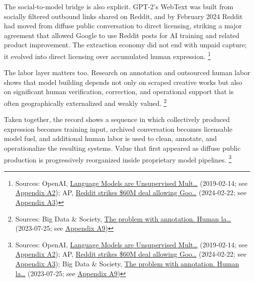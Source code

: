 \documentclass[
  american,
  11pt,
  letterpaper,
]{article}
\begin{document}
The social-to-model bridge is also explicit. GPT-2's WebText was built
from socially filtered outbound links shared on Reddit, and by February
2024 Reddit had moved from diffuse public conversation to direct
licensing, striking a major agreement that allowed Google to use Reddit
posts for AI training and related product improvement. The extraction
economy did not end with unpaid capture; it evolved into direct
licensing over accumulated human expression. \footnote{Sources: OpenAI,
  \href{https://cdn.openai.com/better-language-models/language_models_are_unsupervised_multitask_learners.pdf}{Language
  Models are Unsupervised Mult\ldots{}} (2019-02-14; see
  \hyperref[ch-04-appendix-a2-language-models-are-unsupervised-multitask-learners]{Appendix
  A2}); AP,
  \href{https://apnews.com/article/a7f131c7cb4225307134ef21d3c6a708}{Reddit
  strikes \$60M deal allowing Goo\ldots{}} (2024-02-22; see
  \hyperref[ch-04-appendix-a3-reddit-strikes-60m-deal-allowing-google-to-train-ai-models-on-its-posts-unveils-ipo-plans]{Appendix
  A3})}

The labor layer matters too. Research on annotation and outsourced human
labor shows that model building depends not only on scraped creative
works but also on significant human verification, correction, and
operational support that is often geographically externalized and weakly
valued. \footnote{Sources: Big Data \& Society,
  \href{https://journals.sagepub.com/doi/10.1177/20539517231188723}{The
  problem with annotation. Human la\ldots{}} (2023-07-25; see
  \hyperref[ch-04-appendix-a9-the-problem-with-annotation-human-labour-and-outsourcing-between-france-and-madagascar]{Appendix
  A9})}

Taken together, the record shows a sequence in which collectively
produced expression becomes training input, archived conversation
becomes licensable model fuel, and additional human labor is used to
clean, annotate, and operationalize the resulting systems. Value that
first appeared as diffuse public production is progressively reorganized
inside proprietary model pipelines. \footnote{Sources: OpenAI,
  \href{https://cdn.openai.com/better-language-models/language_models_are_unsupervised_multitask_learners.pdf}{Language
  Models are Unsupervised Mult\ldots{}} (2019-02-14; see
  \hyperref[ch-04-appendix-a2-language-models-are-unsupervised-multitask-learners]{Appendix
  A2}); AP,
  \href{https://apnews.com/article/a7f131c7cb4225307134ef21d3c6a708}{Reddit
  strikes \$60M deal allowing Goo\ldots{}} (2024-02-22; see
  \hyperref[ch-04-appendix-a3-reddit-strikes-60m-deal-allowing-google-to-train-ai-models-on-its-posts-unveils-ipo-plans]{Appendix
  A3}); Big Data \& Society,
  \href{https://journals.sagepub.com/doi/10.1177/20539517231188723}{The
  problem with annotation. Human la\ldots{}} (2023-07-25; see
  \hyperref[ch-04-appendix-a9-the-problem-with-annotation-human-labour-and-outsourcing-between-france-and-madagascar]{Appendix
  A9})}
\end{document}
